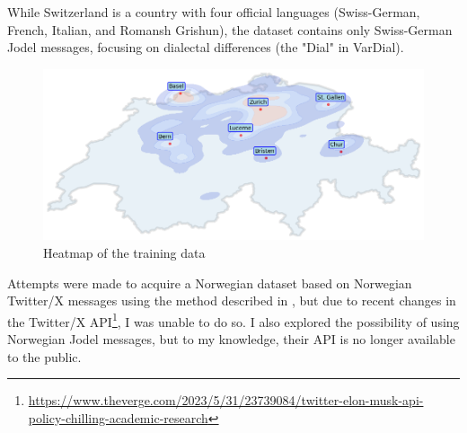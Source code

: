 While Switzerland is a country with four official languages (Swiss-German, French, Italian, and Romansh Grishun), the dataset contains only Swiss-German Jodel messages, focusing on dialectal differences (the "Dial" in VarDial). %


\begin{figure}
    \centering
    \includegraphics[width=\textwidth]{./figs/heatmap.png}
    \caption{Heatmap of the training data}
    \label{fig:heatmap}
\end{figure}

Attempts were made to acquire a Norwegian dataset based on Norwegian Twitter/X messages using the method described in \cite{ljubesicTweetGeoToolCollecting2016}, but due to recent changes in the Twitter/X API\footnote{\url{https://www.theverge.com/2023/5/31/23739084/twitter-elon-musk-api-policy-chilling-academic-research}}, I was unable to do so. I also explored the possibility of using Norwegian Jodel messages, but to my knowledge, their API is no longer available to the public.
